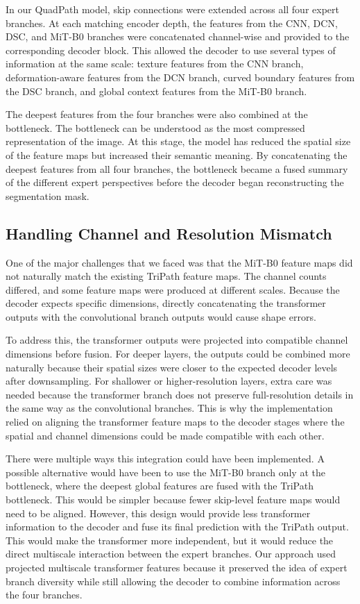 \documentclass[twocolumn]{article}
\begin{document}
In our QuadPath model, skip connections were extended across all four expert branches. At each matching encoder depth, the features from the CNN, DCN, DSC, and MiT-B0 branches were concatenated channel-wise and provided to the corresponding decoder block. This allowed the decoder to use several types of information at the same scale: texture features from the CNN branch, deformation-aware features from the DCN branch, curved boundary features from the DSC branch, and global context features from the MiT-B0 branch.

The deepest features from the four branches were also combined at the bottleneck. The bottleneck can be understood as the most compressed representation of the image. At this stage, the model has reduced the spatial size of the feature maps but increased their semantic meaning. By concatenating the deepest features from all four branches, the bottleneck became a fused summary of the different expert perspectives before the decoder began  reconstructing the segmentation mask.

\subsection{Handling Channel and Resolution Mismatch }

One of the major challenges that we faced was that the MiT-B0 feature maps did not naturally match the existing TriPath feature maps. The channel counts differed, and some feature maps were produced at different scales. Because the decoder expects specific dimensions, directly concatenating the transformer outputs with the convolutional branch outputs would cause shape errors.

To address this, the transformer outputs were projected into compatible channel dimensions before fusion. For deeper layers, the outputs could be combined more naturally because their spatial sizes were closer to the expected decoder levels after downsampling. For shallower or higher-resolution layers, extra care was needed because the transformer branch does not preserve full-resolution details in the same way as the convolutional branches. This is why the implementation relied on aligning the transformer feature maps to the decoder stages where the spatial and channel dimensions could be made compatible with each other.

There were multiple ways this integration could have been implemented. A possible alternative would have been to use the MiT-B0 branch only at the bottleneck, where the deepest global features are fused with the TriPath bottleneck. This would be simpler because fewer skip-level feature maps would need to be aligned. However, this design would provide less transformer information to the decoder and fuse its final prediction with the TriPath output. This would make the transformer more independent, but it would reduce the direct multiscale interaction between the expert branches. Our approach used projected multiscale transformer features because it preserved the idea of expert branch diversity while still allowing the decoder to combine information across the four branches.
\end{document}
